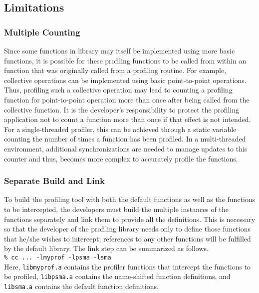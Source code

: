 \subsection{Limitations}
\label{sec:pshmem_limitations}

\subsubsection{Multiple Counting}
\label{sec:pshmem_multiple_count}
Since some functions in \openshmem library may itself be implemented 
using more basic \openshmem functions, it is possible for these 
profiling functions to be called from within an \openshmem function 
that was originally called from a profiling routine. For example, 
\openshmem collective operations can be implemented using basic 
point-to-point operations. Thus, profiling such a collective 
operation may lead to counting a profiling function for 
point-to-point operation more than once after being called from the 
collective function. It is the developer's responsibility to protect 
the profiling application not to count a function more than once if 
that effect is not intended. For a single-threaded profiler, this 
can be achieved through a static variable counting the number of 
times a function has been profiled. In a multi-threaded environment, 
additional synchronizations are needed to manage updates to this 
counter and thus, becomes more complex to accurately profile the 
\openshmem functions.

\subsubsection{Separate Build and Link}
\label{sec:pshmem_separate_build_link}
To build the profiling tool with both the default \openshmem
functions as well as the \openshmem functions to be intercepted, 
the developers must build the multiple instances of the \openshmem
functions separately and link them to provide all the definitions. 
This is necessary so that the developer of the profiling library 
needs only to define those \openshmem functions that he/she wishes 
to intercept; references to any other functions will be fulfilled 
by the default \openshmem library. The link step can be summarized 
as follows. \\

\noindent\texttt{\% cc ... -lmyprof -lpsma -lsma} \\

Here, \texttt{libmyprof.a} contains the profiler functions that 
intercept the \openshmem functions to be profiled, 
\texttt{libpsma.a} contains the name-shifted \openshmem function 
definitions, and \texttt{libsma.a} contains the default \openshmem
function definitions. 

